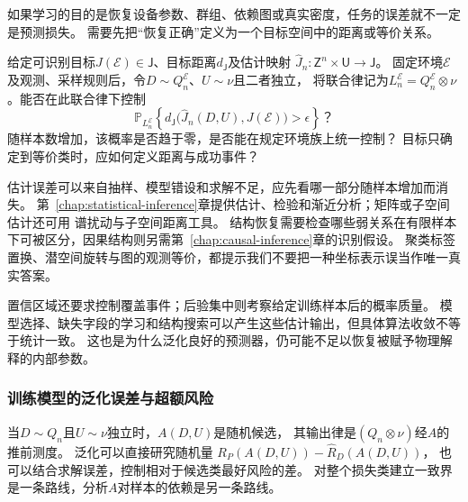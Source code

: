 如果学习的目的是恢复设备参数、群组、依赖图或真实密度，任务的误差就不一定是预测损失。
需要先把“恢复正确”定义为一个目标空间中的距离或等价关系。

\begin{mathproblem}[估计映射的恢复误差与统计一致性]
  \label{question:future-statistical-recovery}
  给定可识别目标$J(\mathcal E)\in\mathsf J$、目标距离$d_{\mathsf J}$及估计映射
  $\widehat J_n:\mathsf Z^n\times\mathsf U\to\mathsf J$。
  固定环境$\mathcal E$及观测、采样规则后，令$D\sim Q_n^{\mathcal E}$、$U\sim\nu$且二者独立，
  将联合律记为$L_n^{\mathcal E}=Q_n^{\mathcal E}\otimes\nu$。能否在此联合律下控制
  \[
    \mathbb P_{L_n^{\mathcal E}}\!\left\{
      d_{\mathsf J}\bigl(\widehat J_n(D,U),J(\mathcal E)\bigr)>\epsilon
    \right\}\text{？}
  \]
  随样本数增加，该概率是否趋于零，是否能在规定环境族上统一控制？
  目标只确定到等价类时，应如何定义距离与成功事件？
\end{mathproblem}

估计误差可以来自抽样、模型错设和求解不足，应先看哪一部分随样本增加而消失。
第~\ref{chap:statistical-inference}章提供估计、检验和渐近分析；矩阵或子空间估计还可用
谱扰动与子空间距离工具。
结构恢复需要检查哪些弱关系在有限样本下可被区分，因果结构则另需第~\ref{chap:causal-inference}章的识别假设。
聚类标签置换、潜空间旋转与图的观测等价，都提示我们不要把一种坐标表示误当作唯一真实答案。

置信区域还要求控制覆盖事件；后验集中则考察给定训练样本后的概率质量。
模型选择、缺失字段的学习和结构搜索可以产生这些估计输出，但具体算法收敛不等于统计一致。
这也是为什么泛化良好的预测器，仍可能不足以恢复被赋予物理解释的内部参数。

\subsubsection{训练模型的泛化误差与超额风险}
\label{sec:future-analysis-learned-risk}

当$D\sim Q_n$且$U\sim\nu$独立时，$A(D,U)$是随机候选，
其输出律是$(Q_n\otimes\nu)$经$A$的推前测度。
泛化可以直接研究随机量
$R_P(A(D,U))-\widehat R_D(A(D,U))$，
也可以结合求解误差，控制相对于候选类最好风险的差。
对整个损失类建立一致界是一条路线，分析$A$对样本的依赖是另一条路线。

